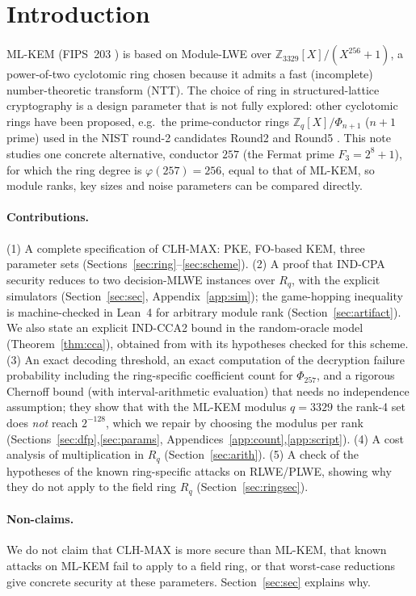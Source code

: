 \documentclass[11pt]{article}
\theoremstyle{remark}
\newcommand{\Z}{\mathbb{Z}}
\newcommand{\Rq}{R_q}
\begin{document}
\section{Introduction}
ML-KEM (FIPS~203 \cite{FIPS203}) is based on Module-LWE over $\Z_{3329}[X]/(X^{256}+1)$, a power-of-two cyclotomic ring chosen because it admits a fast (incomplete) number-theoretic transform (NTT). The choice of ring in structured-lattice cryptography is a design parameter that is not fully explored: other cyclotomic rings have been proposed, e.g.\ the prime-conductor rings $\Z_q[X]/\Phi_{n+1}$ ($n+1$ prime) used in the NIST round-2 candidates Round2 and Round5 \cite{Round5}. This note studies one concrete alternative, conductor $257$ (the Fermat prime $F_3=2^8+1$), for which the ring degree is $\varphi(257)=256$, equal to that of ML-KEM, so module ranks, key sizes and noise parameters can be compared directly.

\paragraph{Contributions.}
(1) A complete specification of CLH-MAX: PKE, FO-based KEM, three parameter sets (Sections~\ref{sec:ring}--\ref{sec:scheme}). (2) A proof that IND-CPA security reduces to two decision-MLWE instances over $\Rq$, with the explicit simulators (Section~\ref{sec:sec}, Appendix~\ref{app:sim}); the game-hopping inequality is machine-checked in Lean~4 for arbitrary module rank (Section~\ref{sec:artifact}). We also state an explicit IND-CCA2 bound in the random-oracle model (Theorem~\ref{thm:cca}), obtained from \cite{HHK17} with its hypotheses checked for this scheme. (3) An exact decoding threshold, an exact computation of the decryption failure probability including the ring-specific coefficient count for $\Phi_{257}$, and a rigorous Chernoff bound (with interval-arithmetic evaluation) that needs no independence assumption; they show that with the ML-KEM modulus $q=3329$ the rank-4 set does \emph{not} reach $2^{-128}$, which we repair by choosing the modulus per rank (Sections~\ref{sec:dfp},\ref{sec:params}, Appendices~\ref{app:count},\ref{app:script}). (4) A cost analysis of multiplication in $\Rq$ (Section~\ref{sec:arith}). (5) A check of the hypotheses of the known ring-specific attacks on RLWE/PLWE, showing why they do not apply to the field ring $\Rq$ (Section~\ref{sec:ringsec}).

\paragraph{Non-claims.} We do not claim that CLH-MAX is more secure than ML-KEM, that known attacks on ML-KEM fail to apply to a field ring, or that worst-case reductions give concrete security at these parameters. Section~\ref{sec:sec} explains why.
\end{document}
